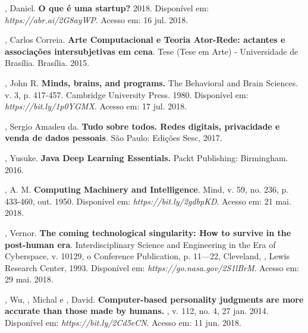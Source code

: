, Daniel. \textbf{O que é uma startup?} 2018. Disponível em:
\emph{https://abr.ai/2G8ayWP}. Acesso em: 16 jul. 2018.

, Carlos Correia. \textbf{Arte Computacional e Teoria Ator-Rede:
actantes e associações intersubjetivas em cena}. Tese (Tese em Arte) -
Universidade de Brasília. Brasília. 2015.

, John R. \textbf{Minds, brains, and programs.} The Behavioral and
Brain Sciences. v. 3, p. 417-457. Cambridge University Press. 1980.
Disponível em: \emph{https://bit.ly/1p0YGMX}. Acesso em: 17 jul. 2018.

, Sergio Amadeu da. \textbf{Tudo sobre todos. Redes digitais,
privacidade e venda de dados pessoais}. São Paulo: Edições Sesc, 2017.

, Yusuke. \textbf{Java Deep Learning Essentials.} Packt
Publishing: Birmingham. 2016.

, A. M. \textbf{Computing Machinery and Intelligence}. Mind, v.
59, no. 236, p. 433-460, out. 1950. Disponível em: \emph{https://bit.ly/2gdbpKD}. Acesso em: 21 mai. 2018.

, Vernor. \textbf{The coming technological singularity: How to
survive in the post-human era}. Interdisciplinary Science and
Engineering in the Era of Cyberspace, v. 10129, o Conference
Publication, p. 11---22, Cleveland, ,  Lewis Research Center,
1993. Disponível em: \emph{https://go.nasa.gov/2S1lBrM}. Acesso em: 29 mai. 2018.

, Wu, , Michal e , David.
\textbf{Computer-based personality judgments are more accurate than
those made by humans.} , v. 112, no. 4, 27 jan. 2014. Disponível em:
\emph{https://bit.ly/2Cd5eCN}. Acesso em: 11 jun. 2018.
